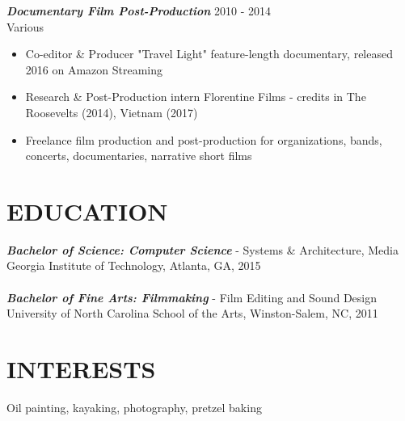 \documentclass[margin]{res}
\begin{document}
\begin{resume}
                {\sl \textbf{Documentary Film Post-Production}} \hfill 2010 - 2014 \\
                Various
                \begin{itemize}  \itemsep -2pt %
                  \item Co-editor \& Producer "Travel Light" feature-length documentary, released 2016 on Amazon Streaming
                  \item Research \& Post-Production intern Florentine Films - credits in The Roosevelts (2014), Vietnam (2017)
                  \item Freelance film production and post-production for organizations, bands, concerts, documentaries, narrative short films
                \end{itemize}

\section{EDUCATION} {\sl \textbf{Bachelor of Science: Computer Science}} - Systems \& Architecture, Media \\
                   Georgia Institute of Technology, Atlanta, GA, 2015\\
                   \\
                   {\sl \textbf{Bachelor of Fine Arts: Filmmaking}} - Film Editing and Sound Design\\
                   University of North Carolina School of the Arts, Winston-Salem, NC, 2011\\

\section{INTERESTS}  Oil painting, kayaking, photography, pretzel baking\\


\end{resume}
\end{document}
